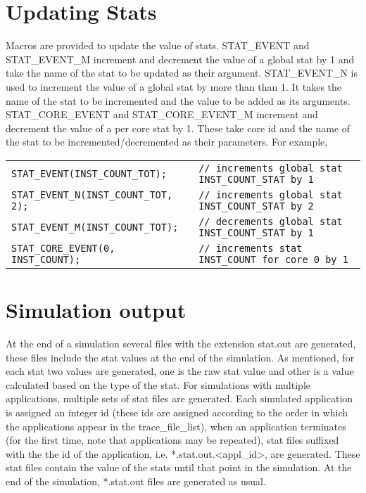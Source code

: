 \section{Updating Stats}
  
Macros are provided to update the value of stats. STAT\_EVENT and
STAT\_EVENT\_M increment and decrement the value of a global stat by 1 and take
the name of the stat to be updated as their argument.  STAT\_EVENT\_N is used
to increment the value of a global stat by more than than 1. It takes the name
of the stat to be incremented and the value to be added as its arguments.
STAT\_CORE\_EVENT and STAT\_CORE\_EVENT\_M increment and decrement the value of
a per core stat by 1. These take core id and the name of the stat to be
incremented/decremented as their parameters. For example,

\begin{tabular}{ll}
 \Verb+STAT_EVENT(INST_COUNT_TOT);+ & \Verb+// increments global stat INST_COUNT_STAT by 1+ \\
 \Verb+STAT_EVENT_N(INST_COUNT_TOT, 2); + & \Verb+// increments global stat INST_COUNT_STAT by 2+ \\
 \Verb+STAT_EVENT_M(INST_COUNT_TOT);+ & \Verb+// decrements global stat INST_COUNT_STAT by 1+ \\
 \Verb+STAT_CORE_EVENT(0, INST_COUNT); + & \Verb+// increments stat INST_COUNT for core 0 by 1+ 
\end{tabular}

\section{Simulation output}

At the end of a simulation several files with the extension stat.out are
generated, these files include the stat values at the end of the
simulation. As mentioned, for each stat two values are generated, one is the
raw stat value and other is a value calculated based on the type of the
stat. For simulations with multiple applications, multiple sets of stat files
are generated. Each simulated application is assigned an integer id (these ids
are assigned according to the order in which the applications appear in the
trace\_file\_list), when an application terminates (for the first time,
note that applications may be repeated), stat files suffixed with the the
id of the application, i.e.  *.stat.out.<appl\_id>, are generated. These
stat files contain the value of the stats until that point in the
simulation. At the end of the simulation, *.stat.out files are generated as
usual.



